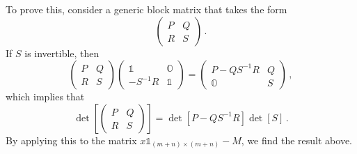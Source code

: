 \documentclass[a4paper,11pt]{article}
\begin{document}
To prove this, consider a generic block matrix that takes the form
\begin{equation}
    \begin{pmatrix}
        P & Q \\ R & S
    \end{pmatrix}\,.
\end{equation}
If $S$ is invertible, then
\begin{equation}
    \begin{pmatrix}
        P & Q \\ R & S
    \end{pmatrix}
    \begin{pmatrix} \mathbb{1} & \mathbb{O} \\ -S^{-1}R & \mathbb{1} 
    \end{pmatrix}
    =
    \begin{pmatrix} P-QS^{-1}R & Q \\ \mathbb{O} & S 
    \end{pmatrix}\,,
\end{equation}
which implies that 
\begin{equation}
    \det[\begin{pmatrix} P & Q \\ R & S \end{pmatrix}]=\det[P-QS^{-1}R] \det[S]\,.
\end{equation}
By applying this to the matrix $x\mathbb{1}_{(m+n)\times(m+n)}-M$, we find the result above.

\clearpage


\end{document}
